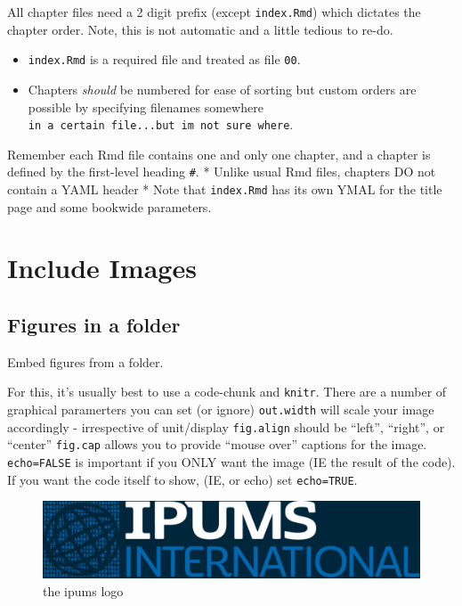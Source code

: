 \documentclass[
]{book}
\begin{document}
All chapter files need a 2 digit prefix (except \texttt{index.Rmd}) which
dictates the chapter order. Note, this is not automatic and a little
tedious to re-do.

\begin{itemize}
\item
  \texttt{index.Rmd} is a required file and treated as file
  \texttt{00}.
\item
  Chapters \emph{should} be numbered for ease of sorting but custom
  orders are possible by specifying filenames somewhere \texttt{in\ a\ certain\ file...but\ i\textquotesingle{}m\ not\ sure\ where}.
\end{itemize}

Remember each Rmd file contains one and only one chapter, and a chapter
is defined by the first-level heading \texttt{\#}.
* Unlike usual Rmd files, chapters DO not contain a YAML header
* Note that \texttt{index.Rmd} has its own YMAL for the title page and some bookwide parameters.

\hypertarget{include-images}{%
\section*{Include Images}\label{include-images}}

\hypertarget{figures-in-a-folder}{%
\subsection{Figures in a folder}\label{figures-in-a-folder}}

Embed figures from a folder.

For this, it's usually best to use a code-chunk and \texttt{knitr}. There are a
number of graphical paramerters you can set (or ignore) \texttt{out.width} will
scale your image accordingly - irrespective of unit/display \texttt{fig.align}
should be ``left'', ``right'', or ``center'' \texttt{fig.cap} allows you to provide
``mouse over'' captions for the image. \texttt{echo=FALSE} is important if you
ONLY want the image (IE the result of the code). If you want the code
itself to show, (IE, or echo) set \texttt{echo=TRUE}.

\begin{figure}

{\centering \includegraphics[width=0.5\linewidth]{imgs/ipums_i_logo} 

}

\caption{the ipums logo}\label{fig:unnamed-chunk-66}
\end{figure}
\end{document}
